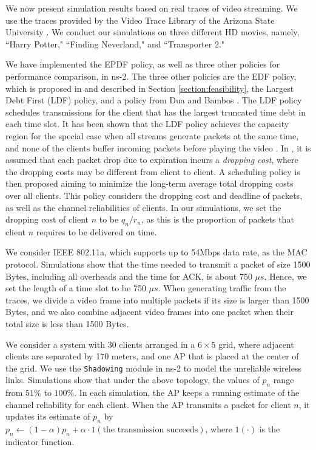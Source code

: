 \documentclass[10pt,nocopyrightspace]{sigplan-proc-varsize-1in}
\begin{document}
We now present simulation results based on real traces of video streaming. We use the traces provided by the Video Trace Library of the Arizona State University \cite{SeRe12,traces2}. We conduct our simulations on three different HD movies, namely, ``Harry Potter," ``Finding Neverland," and ``Transporter 2."

We have implemented the EPDF policy, as well as three other policies for performance comparison, in ns-2. The three other policies are the EDF policy, which is proposed in \cite{CLL73} and described in Section \ref{section:feasibility}, the Largest Debt First (LDF) policy, and a policy from Dua and Bambos \cite{AD07}. The LDF policy schedules transmissions for the client that has the largest truncated time debt in each time slot. It has been shown that the LDF policy achieves the capacity region for the special case when all streams generate packets at the same time, and none of the clients buffer incoming packets before playing the video \cite{IH09}\cite{IH09Hoc}. In \cite{AD07}, it is assumed that each packet drop due to expiration incurs a \emph{dropping cost}, where the dropping costs may be different from client to client. A scheduling policy is then proposed aiming to minimize the long-term average total dropping costs over all clients. This policy considers the dropping cost and deadline of packets, as well as the channel reliabilities of clients. In our simulations, we set the dropping cost of client $n$ to be $q_n/r_n$, as this is the proportion of packets that client $n$ requires to be delivered on time.

We consider IEEE 802.11a, which supports up to 54Mbps data rate, as the MAC protocol. Simulations show that the time needed to transmit a packet of size 1500 Bytes, including all overheads and the time for ACK, is about 750 $\mu s$. Hence, we set the length of a time slot to be 750 $\mu s$. When generating traffic from the traces, we divide a video frame into multiple packets if its size is larger than 1500 Bytes, and we also combine adjacent video frames into one packet when their total size is less than 1500 Bytes.

We consider a system with 30 clients arranged in a $6\times 5$ grid, where adjacent clients are separated by 170 meters, and one AP that is placed at the center of the grid. We use the \texttt{Shadowing} module in ns-2 to model the unreliable wireless links. Simulations show that under the above topology, the values of $p_n$ range from $51\%$ to $100\%$. In each simulation, the AP keeps a running estimate of the channel reliability for each client. When the AP transmits a packet for client $n$, it updates its estimate of $p_n$ by $p_n\leftarrow (1-\alpha)p_n+ \alpha\cdot 1(\mbox{the transmission succeeds})$, where $1(\cdot)$ is the indicator function.
\end{document}
